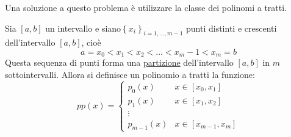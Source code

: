 \documentclass{article}
\begin{document}
\begin{center}
\end{center}
Una soluzione a questo problema è utilizzare la classe dei polinomi a tratti.
\begin{definition}
    Sia $[a,b]$ un intervallo e siano$\left\{x_i\right\}_{i=1,\ldots,m-1}$ punti
    distinti e crescenti dell'intervallo $[a,b]$, cioè
    $$a=x_0<x_1<x_2<\ldots<x_m-1<x_m=b$$
    Questa sequenza di punti forma una \underline{partizione} dell'intervallo $[a,b]$ in
    $m$ sottointervalli. Allora si definisce un polinomio a tratti la
    funzione:
    $$pp(x)=\begin{cases}
        p_0(x) & x \in[x_0,x_1]\\
        p_1(x) & x \in[x_1,x_2]\\
        \vdots \\
        p_{m-1}(x) & x \in[x_{m-1},x_m]
    \end{cases}$$
\end{definition}
\end{document}
